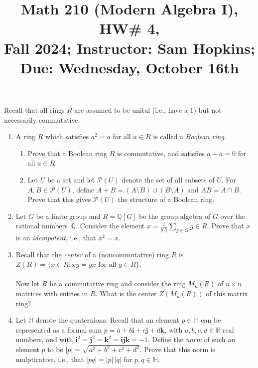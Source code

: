 \documentclass[11pt]{article}
\title{Math 210 (Modern Algebra I), HW\# 4, \\ {\normalsize Fall 2024; Instructor: Sam Hopkins; Due: Wednesday, October 16th}}
\date{}
\begin{document}
\maketitle

\thispagestyle{empty}

Recall that all rings $R$ are assumed to be unital (i.e., have a $1$) but not necessarily commutative.

\begin{enumerate}

\item A ring $R$ which satisfies $a^2 = a$ for all $a\in R$ is called a \emph{Boolean ring}. 
\begin{enumerate}
\item Prove that a Boolean ring $R$ is commutative, and satisfies $a+a=0$ for all $a\in R$.
\item Let $U$ be a set and let $\mathcal{P}(U)$ denote the set of all subsets of $U$. For $A,B \in \mathcal{P}(U)$, define $A+B = (A\setminus B) \cup (B\setminus A)$ and $AB = A\cap B$. Prove that this gives $\mathcal{P}(U)$ the structure of a Boolean ring.
\end{enumerate}

\item Let $G$ be a finite group and $R = \mathbb{Q}[G]$ be the group algebra of $G$ over the rational numbers~$\mathbb{Q}$. Consider the element $x = \displaystyle \frac{1}{|G|}\sum_{g \in G} g \in R$. Prove that $x$ is an \emph{idempotent}, i.e., that $x^2 = x$.

\item Recall that the \emph{center} of a (noncommutative) ring $R$ is $Z(R) = \{x \in R\colon xy = yx \textrm{ for all $y \in R$}\}$. \\
\\ Now let $R$ be a commutative ring and consider the ring $M_n(R)$ of $n\times n$ matrices with entries in $R$. What is the center $Z(M_n(R))$ of this matrix ring?

\item Let $\mathbb{H}$ denote the quaternions. Recall that an element $p\in \mathbb{H}$ can be represented as a formal sum $p=a + b\mathbf{i} + c\mathbf{j} + d\mathbf{k}$, with $a,b,c,d\in \mathbb{R}$ real numbers, and with $\mathbf{i}^2=\mathbf{j}^2=\mathbf{k}^2=\mathbf{ijk}=-1$. Define the \emph{norm} of such an element $p$ to be $|p| = \sqrt{a^2+b^2+c^2+d^2}$. Prove that this norm is mulpticative, i.e., that $| p q | = |p| \, |q|$ for $p,q \in \mathbb{H}$.


\end{enumerate}
\end{document}
